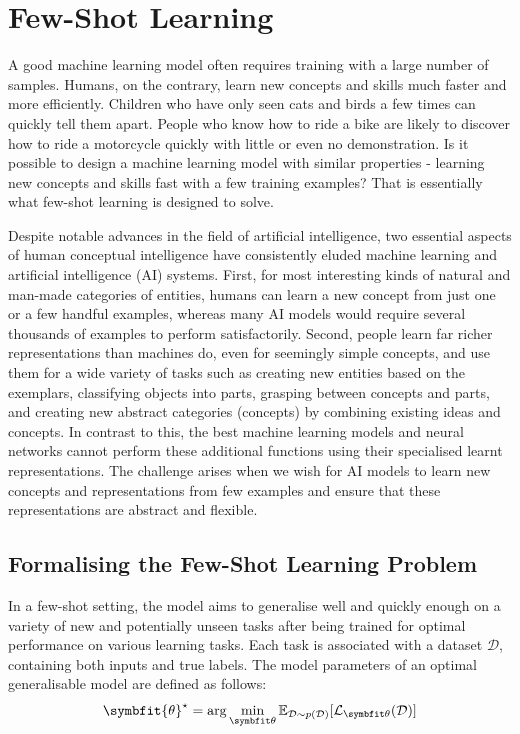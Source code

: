 \newcommand{\mcQ}{\mathcal{Q}}
\newcommand{\mcS}{\mathcal{S}}
\newcommand{\mcT}{\mathcal{T}}
\newcommand{\nwks}[2]{${#1}$-way, ${#2}$-shot}

\chapter{Few-Shot Learning}\label{chap:fsl}
A good machine learning model often requires training with a large number of samples. Humans, on the contrary, learn new concepts and skills much faster and more efficiently. Children who have only seen cats and birds a few times can quickly tell them apart. People who know how to ride a bike are likely to discover how to ride a motorcycle quickly with little or even no demonstration. Is it possible to design a machine learning model with similar properties - learning new concepts and skills fast with a few training examples? That is essentially what few-shot learning is designed to solve.

Despite notable advances in the field of artificial intelligence, two essential aspects of human conceptual intelligence have consistently eluded machine learning and artificial intelligence (AI) systems. 
First, for most interesting kinds of natural and man-made categories of entities, humans can learn a new concept from just one or a few handful examples, whereas many AI models would require several thousands of examples to perform satisfactorily. 
Second, people learn far richer representations than machines do, even for seemingly simple concepts, and use them for a wide variety of tasks such as creating new entities based on the exemplars, classifying objects into parts, grasping between concepts and parts, and creating new abstract categories (concepts) by combining existing ideas and concepts.
In contrast to this, the best machine learning models and neural networks cannot perform these additional functions using their specialised learnt representations. 
The challenge arises when we wish for AI models to learn new concepts and representations from few examples and ensure that these representations are abstract and flexible.

\section{Formalising the Few-Shot Learning Problem}\label{sec:formalising-fsl}

In a few-shot setting, the model aims to generalise well and quickly enough on a variety of new and potentially unseen tasks after being trained for optimal performance on various learning tasks.
Each task is associated with a dataset $\mathcal{D}$, containing both inputs and true labels. 
The model parameters of an optimal generalisable model are defined as follows:
\begin{equation}
    \symbfit{\theta}^\star = \arg\min_{\symbfit \theta} \mathbb{E}_{\mathcal{D}\sim p(\mathcal{D})} [\mathcal{L}_{\symbfit \theta}(\mathcal{D})]
\end{equation}

